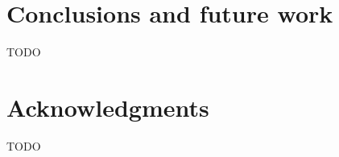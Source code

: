 \documentclass[dvipsnames,format=sigconf,anonymous=true,review=true]{acmart}
\begin{document}
\section{Conclusions and future work}
 TODO
 
\section*{Acknowledgments} 
TODO



 
\end{document}
